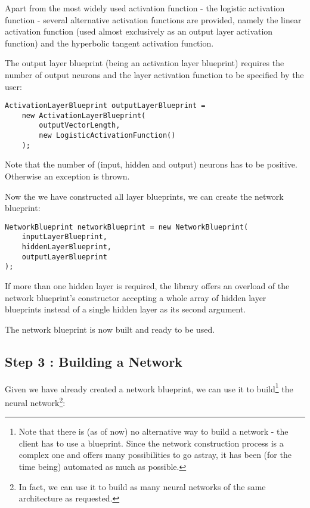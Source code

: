 \medskip
  
Apart from the most widely used activation function - the logistic activation function - several alternative activation functions are provided, namely the linear activation function (used almost exclusively as an output layer activation function) and the hyperbolic tangent activation function.

The output layer blueprint (being an activation layer blueprint) requires the number of output neurons and the layer activation function to be specified by the user:

\medskip

\begin{verbatim}
ActivationLayerBlueprint outputLayerBlueprint =
    new ActivationLayerBlueprint(
        outputVectorLength,
        new LogisticActivationFunction()
    );
\end{verbatim}

\medskip
  
Note that the number of (input, hidden and output) neurons has to be positive. Otherwise an exception is thrown.

Now the we have constructed all layer blueprints, we can create the network blueprint:

\medskip

\begin{verbatim}
NetworkBlueprint networkBlueprint = new NetworkBlueprint(
    inputLayerBlueprint,
    hiddenLayerBlueprint,
    outputLayerBlueprint
);
\end{verbatim}

\medskip

If more than one hidden layer is required, the library offers an overload of the network blueprint's constructor accepting a whole array of hidden layer blueprints instead of a single hidden layer as its second argument.
  
The network blueprint is now built and ready to be used.

\subsection{Step 3 : Building a Network}

Given we have already created a network blueprint, we can use it to build\footnote{Note that there is (as of now) no alternative way to build a network - the client has to use a blueprint. Since the network construction process is a complex one and offers many possibilities to go astray, it has been (for the time being) automated as much as possible.} the neural network\footnote{In fact, we can use it to build as many neural networks of the same architecture as requested.}:

